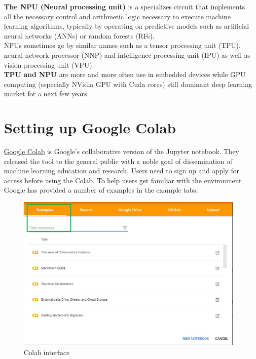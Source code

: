 \documentclass[a4paper,10pt]{article}
\begin{document}
\textbf{The NPU (Neural processing unit)} is a specializes circuit that implements all the necessary control and arithmetic logic necessary to execute machine learning algorithms, typically by operating on predictive models such as artificial neural networks (ANNs) or random forests (RFs).\\
NPUs sometimes go by similar names such as a tensor processing unit (TPU), neural network processor (NNP) and intelligence processing unit (IPU) as well as vision processing unit (VPU).\\
\textbf{TPU and NPU} are more and more often use in embedded devices while GPU computing (especially NVidia GPU with Cuda cores) still dominant deep learning market for a next few years.



\section{Setting up Google Colab}
\label{sec:Colab}

\href{https://colab.research.google.com/}{Google Colab} is Google's collaborative version of the Jupyter notebook. They released the tool to the general public with a noble goal of dissemination of machine learning education and research.\cite{Colab}
Users need to sign up and apply for access before using the Colab. 
To help users get familiar with the environment Google has provided a number of examples in the example tabs: 

\begin{figure}[H]
\centering
\includegraphics[width=1\columnwidth]{Pictures/Colab_interface.jpg}
\caption[Short title]{Colab interface}
\label{fig:ff1}\end{figure}
\end{document}
